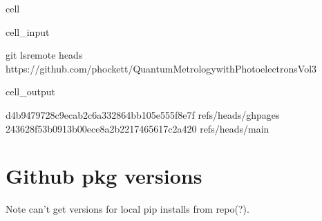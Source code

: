\documentclass[letterpaper,table,10pt,english]{jupyterBook}
\begin{document}
\begin{sphinxuseclass}{cell}\begin{sphinxVerbatimInput}

\begin{sphinxuseclass}{cell_input}
\begin{sphinxVerbatim}[commandchars=\\\{\}]
git ls\PYGZhy{}remote \PYGZhy{}\PYGZhy{}heads https://github.com/phockett/Quantum\PYGZhy{}Metrology\PYGZhy{}with\PYGZhy{}Photoelectrons\PYGZhy{}Vol3
\end{sphinxVerbatim}

\end{sphinxuseclass}\end{sphinxVerbatimInput}
\begin{sphinxVerbatimOutput}

\begin{sphinxuseclass}{cell_output}
\begin{sphinxVerbatim}[commandchars=\\\{\}]
d4b9479728c9ecab2c6a332864bb105e555f8e7f	refs/heads/gh\PYGZhy{}pages
243628f53b0913b00ece8a2b2217465617c2a420	refs/heads/main
\end{sphinxVerbatim}

\end{sphinxuseclass}\end{sphinxVerbatimOutput}

\end{sphinxuseclass}

\section{Github pkg versions}
\label{\detokenize{tests/build_versions_checks:github-pkg-versions}}
\sphinxAtStartPar
Note \sphinxhyphen{} can’t get versions for local pip installs from repo(?).
\end{document}
